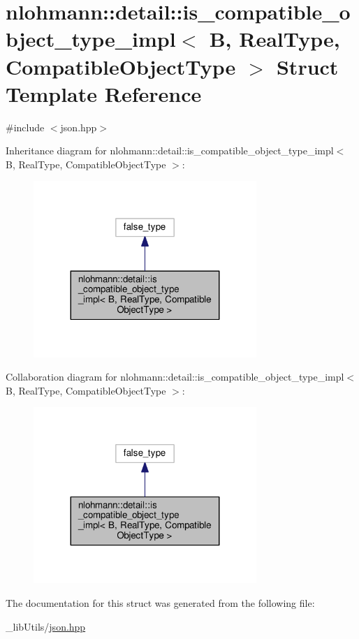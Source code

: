 \hypertarget{structnlohmann_1_1detail_1_1is__compatible__object__type__impl}{}\section{nlohmann\+:\+:detail\+:\+:is\+\_\+compatible\+\_\+object\+\_\+type\+\_\+impl$<$ B, Real\+Type, Compatible\+Object\+Type $>$ Struct Template Reference}
\label{structnlohmann_1_1detail_1_1is__compatible__object__type__impl}


{\ttfamily \#include $<$json.\+hpp$>$}



Inheritance diagram for nlohmann\+:\+:detail\+:\+:is\+\_\+compatible\+\_\+object\+\_\+type\+\_\+impl$<$ B, Real\+Type, Compatible\+Object\+Type $>$\+:\nopagebreak
\begin{figure}[H]
\begin{center}
\leavevmode
\includegraphics[width=239pt]{structnlohmann_1_1detail_1_1is__compatible__object__type__impl__inherit__graph}
\end{center}
\end{figure}


Collaboration diagram for nlohmann\+:\+:detail\+:\+:is\+\_\+compatible\+\_\+object\+\_\+type\+\_\+impl$<$ B, Real\+Type, Compatible\+Object\+Type $>$\+:\nopagebreak
\begin{figure}[H]
\begin{center}
\leavevmode
\includegraphics[width=239pt]{structnlohmann_1_1detail_1_1is__compatible__object__type__impl__coll__graph}
\end{center}
\end{figure}


The documentation for this struct was generated from the following file\+:\begin{DoxyCompactItemize}
\item 
\+\_\+lib\+Utils/\hyperlink{json_8hpp}{json.\+hpp}\end{DoxyCompactItemize}

